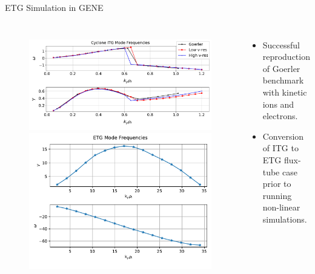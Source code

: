\documentclass[aspectratio=43]{beamer}
\begin{document}
   \begin{frame}{ETG Simulation in GENE}
      \begin{columns}
         \begin{figure}
            \includegraphics[width=.8\textwidth, height=.35\textheight]{Images/LinearITG_KinEl_GrowthRates.pdf}
            \includegraphics[width=.8\textwidth, height=.45\textheight]{Images/GrowthRates_ETG.pdf}
         \end{figure}
         \begin{itemize}
            \item Successful reproduction of Goerler benchmark with kinetic ions and electrons.
            \vspace{10mm}
            \item Conversion of ITG to ETG flux-tube case prior to running non-linear simulations.
         \end{itemize}
      \end{columns}
   \end{frame}
\end{document}
